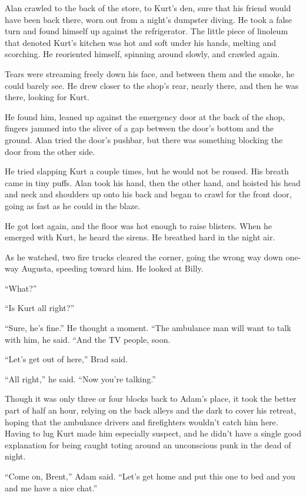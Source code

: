 \documentclass{article}
\begin{document}
Alan crawled to the back of the store, to Kurt's den, sure that his
friend would have been back there, worn out from a night's dumpster
diving.  He took a false turn and found himself up against the
refrigerator.  The little piece of linoleum that denoted Kurt's
kitchen was hot and soft under his hands, melting and scorching.  He
reoriented himself, spinning around slowly, and crawled again. 

Tears were streaming freely down his face, and between them and the
smoke, he could barely see.  He drew closer to the shop's rear, nearly
there, and then he was there, looking for Kurt.

He found him, leaned up against the emergency door at the back of the
shop, fingers jammed into the sliver of a gap between the door's
bottom and the ground.  Alan tried the door's pushbar, but there was
something blocking the door from the other side. 

He tried slapping Kurt a couple times, but he would not be roused. 
His breath came in tiny puffs.  Alan took his hand, then the other
hand, and hoisted his head and neck and shoulders up onto his back and
began to crawl for the front door, going as fast as he could in the
blaze.

He got lost again, and the floor was hot enough to raise blisters. 
When he emerged with Kurt, he heard the sirens.  He breathed hard in
the night air.

As he watched, two fire trucks cleared the corner, going the wrong way
down one-way Augusta, speeding toward him.  He looked at Billy.

``What?''

``Is Kurt all right?''

``Sure, he's fine.'' He thought a moment.  ``The ambulance man will
want to talk with him, he said.  ``And the TV people, soon.

``Let's get out of here,'' Brad said.

``All right,'' he said.  ``Now you're talking.''

Though it was only three or four blocks back to Adam's place, it took
the better part of half an hour, relying on the back alleys and the
dark to cover his retreat, hoping that the ambulance drivers and
firefighters wouldn't catch him here.  Having to lug Kurt made him
especially suspect, and he didn't have a single good explanation for
being caught toting around an unconscious punk in the dead of night.

``Come on, Brent,'' Adam said.  ``Let's get home and put this one to
bed and you and me have a nice chat.''
\end{document}
